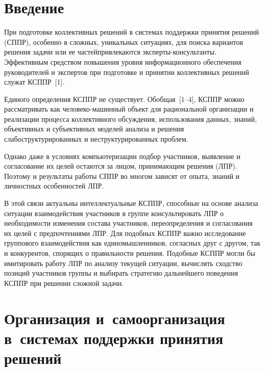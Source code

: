       \begin{multicols}{2}

      \label{st\stat}
  
\section{Введение}
  
  При подготовке коллективных решений в сис\-те\-мах поддержки принятия
  решений (\mbox{СППР}), особенно в сложных, уникальных ситуациях, для поиска 
вариантов решения задачи или ее %
частей\linebreak привлекаются эксперты-консультанты. %
Эффективным средством повышения уровня информационного обеспечения 
руководителей и экспертов при подготовке и принятии коллективных решений 
служат \mbox{КСППР}~[1].
  
  Единого определения \mbox{КСППР} не существует. Обобщая~[1--4], \mbox{КСППР} 
можно рассматривать как человеко-машинный объект для рациональной 
организации и реализации процесса коллективного обсуждения, использования 
данных, знаний, объективных и субъективных моделей анализа и решения 
слабоструктурированных и неструктурированных проблем.
  
  Однако даже в условиях компьютеризации подбор участников, выявление и 
согласование их целей остаются за лицом, принимающим решения (ЛПР). 
Поэтому и результаты работы СППР во многом зависят от опыта, знаний и 
личностных особенностей ЛПР.
  
  В этой связи актуальны интеллектуальные \mbox{КСППР}, способные на основе 
анализа ситуации взаимодействия участников в группе консультировать ЛПР о 
необходимости изменения состава участников, переопределения и 
согласования их целей с предпочтениями ЛПР. Для подобных \mbox{КСППР} важно 
исследование группового взаимодействия как единомышленников, согласных 
друг с другом, так и конкурентов, спорящих о правильности решения. 
Подобные \mbox{КСППР} могли бы имити\-ро\-вать работу ЛПР по анализу текущей 
ситуации, вычислять сходство позиций участников группы и выбирать 
стратегию дальнейшего поведения \mbox{КСППР} при решении сложной задачи.

\vspace*{-6pt}
  
\section{Организация и~самоорганизация в~системах поддержки 
принятия решений}
\vspace*{-2pt}
  

\end{multicols}
